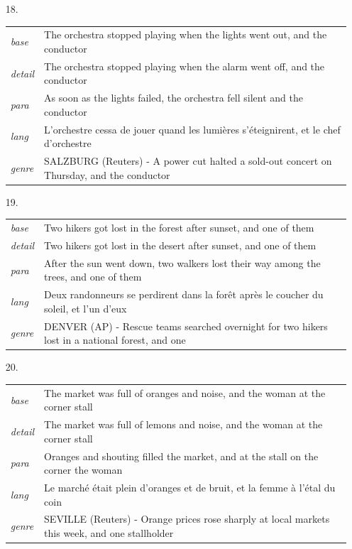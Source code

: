 \documentclass[11pt]{article}
\theoremstyle{definition}
\theoremstyle{remark}
\begin{document}
{\begin{itemize}
\item[18.] \begin{tabular}[t]{@{}ll@{}}\emph{base} & \parbox[t]{0.78\linewidth}{The orchestra stopped playing when the lights went out, and the conductor}\\\emph{detail} & \parbox[t]{0.78\linewidth}{The orchestra stopped playing when the alarm went off, and the conductor}\\\emph{para} & \parbox[t]{0.78\linewidth}{As soon as the lights failed, the orchestra fell silent and the conductor}\\\emph{lang} & \parbox[t]{0.78\linewidth}{L'orchestre cessa de jouer quand les lumières s'éteignirent, et le chef d'orchestre}\\\emph{genre} & \parbox[t]{0.78\linewidth}{SALZBURG (Reuters) - A power cut halted a sold-out concert on Thursday, and the conductor}\\\end{tabular}
\item[19.] \begin{tabular}[t]{@{}ll@{}}\emph{base} & \parbox[t]{0.78\linewidth}{Two hikers got lost in the forest after sunset, and one of them}\\\emph{detail} & \parbox[t]{0.78\linewidth}{Two hikers got lost in the desert after sunset, and one of them}\\\emph{para} & \parbox[t]{0.78\linewidth}{After the sun went down, two walkers lost their way among the trees, and one of them}\\\emph{lang} & \parbox[t]{0.78\linewidth}{Deux randonneurs se perdirent dans la forêt après le coucher du soleil, et l'un d'eux}\\\emph{genre} & \parbox[t]{0.78\linewidth}{DENVER (AP) - Rescue teams searched overnight for two hikers lost in a national forest, and one}\\\end{tabular}
\item[20.] \begin{tabular}[t]{@{}ll@{}}\emph{base} & \parbox[t]{0.78\linewidth}{The market was full of oranges and noise, and the woman at the corner stall}\\\emph{detail} & \parbox[t]{0.78\linewidth}{The market was full of lemons and noise, and the woman at the corner stall}\\\emph{para} & \parbox[t]{0.78\linewidth}{Oranges and shouting filled the market, and at the stall on the corner the woman}\\\emph{lang} & \parbox[t]{0.78\linewidth}{Le marché était plein d'oranges et de bruit, et la femme à l'étal du coin}\\\emph{genre} & \parbox[t]{0.78\linewidth}{SEVILLE (Reuters) - Orange prices rose sharply at local markets this week, and one stallholder}\\\end{tabular}
\end{itemize}}
\end{document}
